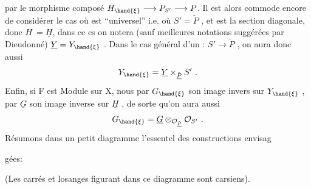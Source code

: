 
par le morphisme composé $H_{\hand{\xi}} \longrightarrow P_{S'} \longrightarrow P$. Il est alors commode
 encore de considérer le cas où \hand{$\xi$} est
``universel'' i.e. où $S' = \check{P}$ , et \hand{$\xi$} est la section diagonale, donc $H \ = \underline{H}$,
dans ce cs on notera (sauf meilleures notations suggérées par Dieudonné)
$\underline{Y} = Y_{\hand{\xi}}$ . Dans le cas général d'un \hand{$\xi$}: $S' \to \check{P}$ , on aura donc aussi
\[ Y_{\hand{\xi}} = \underline{Y} \times_{\check{\underline{P}}} S' \ . \]
Enfin, si F est Module sur X, nous  par $G_{\hand{\xi}}$ son image invers
sur $Y_{\hand{\xi}}$ , par $\underline{G}$ son image inverse sur $\underline{H}$ , de sorte qu'on aura aussi
\[ G_{\hand{\xi}} = \underline{G} \otimes_{\mathcal{O}_{\check{\underline{P}}}} \mathcal{O}_{S'} \ . \]
Résumons dans un petit diagramme l'essentel des constructions  envisag

gées:

(Les carrés et losanges figurant dans ce diagramme sont carsiens).

